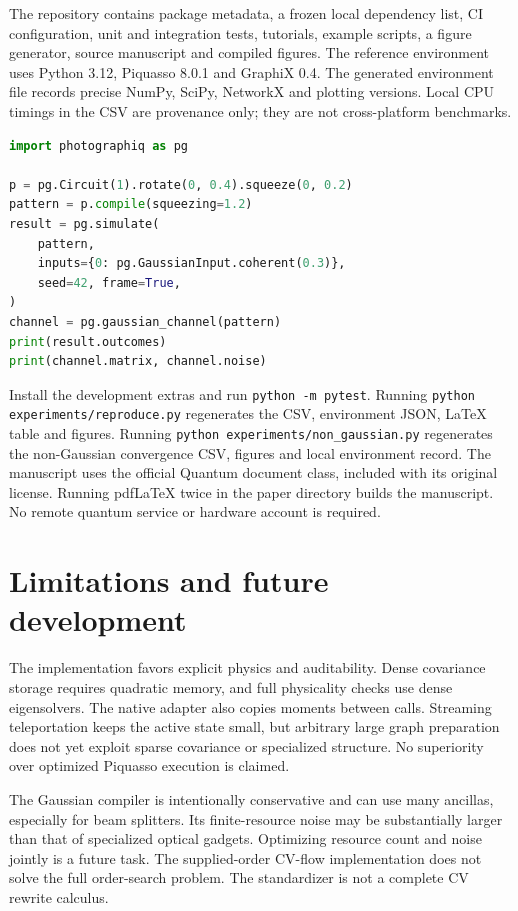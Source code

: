 \documentclass[a4paper,twocolumn,11pt,nopdfoutputerror]{quantumarticle}
\begin{document}
The repository contains package metadata, a frozen local dependency list, CI
configuration, unit and integration tests, tutorials, example scripts, a figure
generator, source manuscript and compiled figures. The reference environment
uses Python 3.12, Piquasso 8.0.1 and GraphiX 0.4. The generated environment file
records precise NumPy, SciPy, NetworkX and plotting versions. Local CPU timings
in the CSV are provenance only; they are not cross-platform benchmarks.

\begin{lstlisting}[language=Python]
import photographiq as pg

p = pg.Circuit(1).rotate(0, 0.4).squeeze(0, 0.2)
pattern = p.compile(squeezing=1.2)
result = pg.simulate(
    pattern,
    inputs={0: pg.GaussianInput.coherent(0.3)},
    seed=42, frame=True,
)
channel = pg.gaussian_channel(pattern)
print(result.outcomes)
print(channel.matrix, channel.noise)
\end{lstlisting}

Install the development extras and run \texttt{python -m pytest}. Running
\texttt{python experiments/reproduce.py} regenerates the CSV, environment JSON,
LaTeX table and figures. Running
\texttt{python experiments/non\_gaussian.py} regenerates the non-Gaussian
convergence CSV, figures and local environment record. The manuscript uses the official Quantum document class,
included with its original license. Running pdfLaTeX twice in the paper directory
builds the manuscript. No remote quantum service or hardware account is required.

\section{Limitations and future development}

The implementation favors explicit physics and auditability. Dense covariance
storage requires quadratic memory, and full physicality checks use dense
eigensolvers. The native adapter also copies moments between calls. Streaming
teleportation keeps the active state small, but arbitrary large graph preparation
does not yet exploit sparse covariance or specialized structure. No superiority
over optimized Piquasso execution is claimed.

The Gaussian compiler is intentionally conservative and can use many ancillas,
especially for beam splitters. Its finite-resource noise may be substantially
larger than that of specialized optical gadgets. Optimizing resource count and
noise jointly is a future task. The supplied-order CV-flow implementation does
not solve the full order-search problem. The standardizer is not a complete
CV rewrite calculus.
\end{document}
